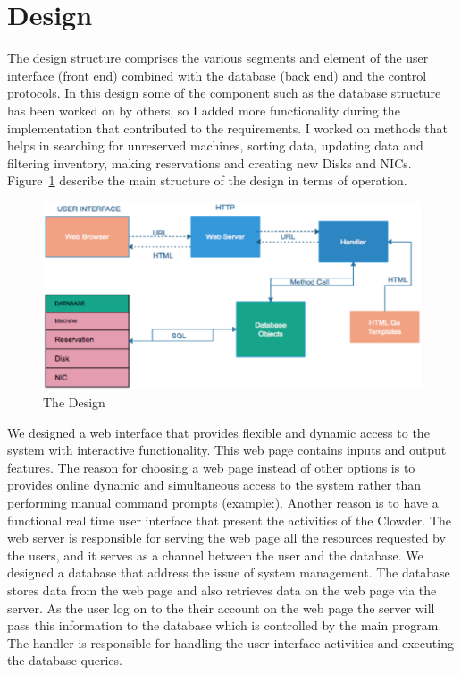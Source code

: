 \section{Design}
The design structure comprises the various  segments and element of the user interface (front end) combined with the database (back end)  and the control protocols. In this design some of the component such as the database structure has been worked on by others, so I added more functionality during the implementation that contributed to the requirements. I worked on  methods that helps in searching for unreserved machines, sorting data, updating data and filtering inventory, making reservations and creating new Disks and NICs.  Figure~\ref{fig:Design} describe the main structure of the design in terms of operation.
\begin{figure}[h]
  \includegraphics[width=\linewidth]{Design.eps}
  \caption{The Design}
  \label{fig:Design}
\end{figure}
\pagebreak
We designed a web interface that provides  flexible and dynamic access to the system with interactive functionality. This web page contains inputs and output features. The reason for choosing a web page instead of other options is to provides online dynamic and simultaneous  access to the system rather than performing manual command prompts (example:). Another reason is to have a functional real time user interface that present the activities of the Clowder. The web server is responsible for serving the web page all the resources requested by the users, and it serves as a channel between the user and the database. We designed a database that address the issue of system management. The database stores data from the web page and also retrieves data on the web page via the server. As the user log on to the their account on the web page the server will pass this information to the database which is controlled by the main program. The handler is responsible for handling the user interface activities and executing the database queries.  

